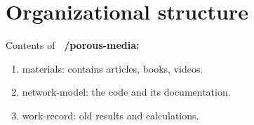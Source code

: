 \section{Organizational structure}
	Contents of \textbf{~/porous-media:}
	\begin{enumerate}
		\item materials: contains articles, books, videos.
		\item network-model: the code and its documentation.
		\item work-record: old results and calculations.
	\end{enumerate}


